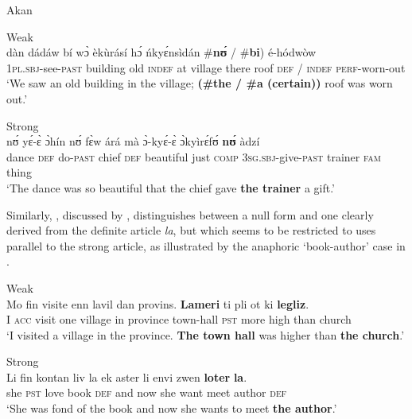 \documentclass[output=paper
,modfonts
,nonflat]{langscibook}
\begin{document}
{\begin{exe}
\ex\label{ex:schwarz:15} Akan \citep[14--15]{ArkohMatthewson2013}
\begin{xlist}
\ex\label{ex:schwarz:15a} Weak\\  {d\`an} {d\'ad\'aw} {b\'i} {w\`ɔ}
{\`ek\`ur\'as\'i} {h\'ɔ} {\'nky\'ɛns\`id\'an}
{\op}\textnormal{\#}\textbf{n\'ʊ} \textnormal{/} \textnormal{\#}\textbf{bi}) {\'e-h\'odw\`ow}\\
1\textsc{pl.sbj}-see-\textsc{past} building old \textsc{indef} at village there roof {\phantom{\#}}\textsc{def} / {\phantom{\#}}{\textsc{indef}} \textsc{perf}-worn-out\\
\glt `We saw an old building in the village; \textbf{(\#the / \#a (certain))}
roof was worn out.'

\ex\label{ex:schwarz:15b} Strong\\ 
 {n\'ʊ} {y\'ɛ-\`ɛ}
{\`ɔh\'in} {n\'ʊ} {f\`ɛw} {\'ar\'a}
{m\`a} {\`ɔ-ky\'ɛ-\`ɛ} {\`ɔky\`ir\'ɛf\'ʊ} \textbf{n\'ʊ} {\`adz\'i}\\
dance \textsc{def} do-\textsc{past} chief \textsc{def} beautiful just \textsc{comp} 3\textsc{sg.sbj}-give-\textsc{past}
trainer \textsc{fam} thing\\
\glt `The dance was so beautiful that the chief gave \textbf{the trainer} a gift.'
\end{xlist}
\end{exe}}

Similarly, , discussed by \citet{Wespel2008}, distinguishes between a null form  and one clearly derived
from the  definite article \textit{la}, but which seems to be
restricted to uses parallel to the strong article,
as illustrated by the anaphoric `book-author'  case in .

\begin{exe}
\ex\label{ex:schwarz:16}
\begin{xlist}
\ex\label{ex:schwarz:16a} 
Weak\\ \gll Mo fin visite enn lavil dan provins. \textbf{Lameri} ti pli ot ki \textbf{legliz}.\\
 I \textsc{acc} visit one village in province {town-hall} \textsc{pst} more high than {church}\\
\glt `I visited a village in the province. \textbf{The town hall} was higher than \textbf{the church}.'
 
\ex\label{ex:schwarz:16b}
Strong\\ \gll Li fin kontan liv la ek aster li envi zwen \textbf{loter} \textbf{la}.\\
she \textsc{pst} love	book \textsc{def} and now she want meet {author} {\textsc{def}}\\
\glt `She was fond of the book and now she wants to meet \textbf{the author}.'

\end{xlist}
\end{exe}
\end{document}
